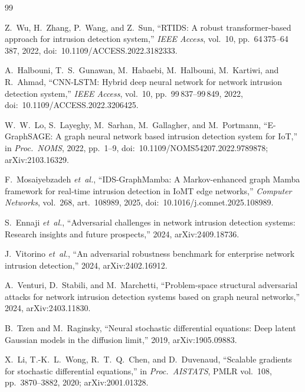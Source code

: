 \documentclass[journal,10pt]{IEEEtran}
\theoremstyle{definition}
\theoremstyle{remark}
\begin{document}
\begin{thebibliography}{99}

 Z.~Wu, H.~Zhang, P.~Wang, and Z.~Sun,
``RTIDS: A robust transformer-based approach for intrusion detection
system,'' \emph{IEEE Access}, vol.~10, pp.~64\,375--64\,387, 2022,
doi:~10.1109/ACCESS.2022.3182333.

 A.~Halbouni, T.~S.~Gunawan, M.~Habaebi,
M.~Halbouni, M.~Kartiwi, and R.~Ahmad, ``CNN-LSTM: Hybrid deep
neural network for network intrusion detection system,''
\emph{IEEE Access}, vol.~10, pp.~99\,837--99\,849, 2022,
doi:~10.1109/ACCESS.2022.3206425.

 W.~W.~Lo, S.~Layeghy, M.~Sarhan, M.~Gallagher,
and M.~Portmann, ``E-GraphSAGE: A graph neural network based intrusion
detection system for IoT,'' in \emph{Proc.\ NOMS}, 2022, pp.~1--9,
doi:~10.1109/NOMS54207.2022.9789878; arXiv:2103.16329.

 F.~Mosaiyebzadeh \textit{et~al.},
``IDS-GraphMamba: A Markov-enhanced graph Mamba framework for
real-time intrusion detection in IoMT edge networks,''
\emph{Computer Networks}, vol.~268, art.~108989, 2025,
doi:~10.1016/j.comnet.2025.108989.

 S.~Ennaji \textit{et~al.}, ``Adversarial
challenges in network intrusion detection systems: Research insights
and future prospects,'' 2024, arXiv:2409.18736.

 J.~Vitorino \textit{et~al.}, ``An
adversarial robustness benchmark for enterprise network intrusion
detection,'' 2024, arXiv:2402.16912.

 A.~Venturi, D.~Stabili, and M.~Marchetti,
``Problem-space structural adversarial attacks for network intrusion
detection systems based on graph neural networks,'' 2024, arXiv:2403.11830.

 B.~Tzen and M.~Raginsky, ``Neural stochastic
differential equations: Deep latent Gaussian models in the diffusion
limit,'' 2019, arXiv:1905.09883.

 X.~Li, T.-K.~L.~Wong, R.~T.~Q.~Chen, and
D.~Duvenaud, ``Scalable gradients for stochastic differential
equations,'' in \emph{Proc.\ AISTATS}, PMLR vol.~108,
pp.~3870--3882, 2020; arXiv:2001.01328.


\end{thebibliography}
\end{document}
